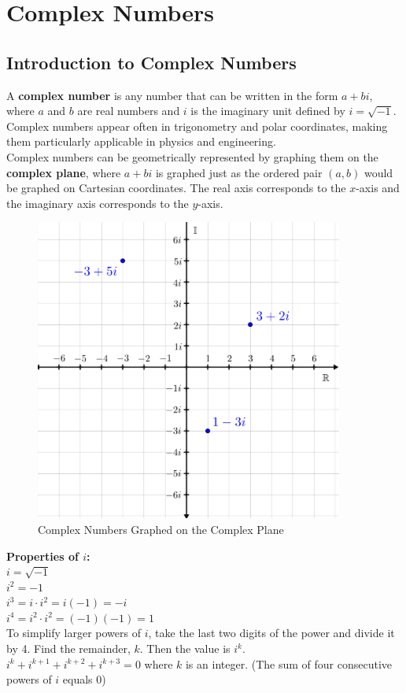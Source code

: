 \section{Complex Numbers}

    \subsection{Introduction to Complex Numbers}
        A \textbf{complex number} is any number that can be written in the form $a+bi$, where
        $a$ and $b$ are real numbers and $i$ is the imaginary unit defined by $i=\sqrt{-1}$.
        Complex numbers appear often in trigonometry and polar coordinates, making them
        particularly applicable in physics and engineering. \\

        \noindent Complex numbers can be geometrically represented by graphing them on the
        \textbf{complex plane}, where $a+bi$ is graphed just as the ordered pair $(a,b)$ would
        be graphed on Cartesian coordinates. The real axis corresponds to the $x$-axis and the
        imaginary axis corresponds to the $y$-axis.\\

        \begin{figure} [hbt!]
            \centering
            \includegraphics[scale=0.75]{Resources/Unit4Complex/complex.PNG}
            \caption*{Complex Numbers Graphed on the Complex Plane}
        \end{figure}

        \noindent \textbf{Properties of $i$:} \\
        $i=\sqrt{-1}$ \\
        $i^2=-1$ \\
        $i^3=i\cdot i^2=i(-1)=-i$ \\
        $i^4=i^2\cdot i^2=(-1)(-1)=1$ \\
        To simplify larger powers of $i$, take the last two digits of the power and divide it by
        4. Find the remainder, $k$. Then the value is $i^k$. \\
        $i^k+i^{k+1}+i^{k+2}+i^{k+3}=0$ where $k$ is an integer. (The sum of four consecutive
        powers of $i$ equals 0)


